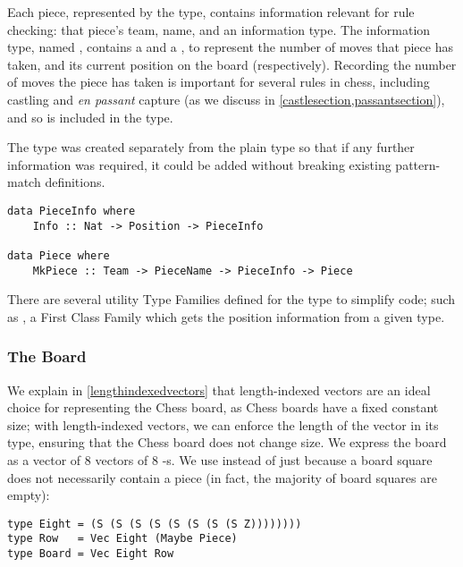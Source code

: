 Each piece, represented by the  type, contains information relevant for rule checking: that piece's team, name, and an information type. The information type, named , contains a  and a , to represent the number of moves that piece has taken, and its current position on the board (respectively). Recording the number of moves the piece has taken is important for several rules in chess, including castling and \textit{en passant} capture (as we discuss in \cref{castlesection,passantsection}), and so is included in the  type.

The  type was created separately from the plain  type so that if any further information was required, it could be added without breaking existing  pattern-match definitions.

\begin{lstlisting}
data PieceInfo where
    Info :: Nat -> Position -> PieceInfo

data Piece where
    MkPiece :: Team -> PieceName -> PieceInfo -> Piece
\end{lstlisting}

There are several utility Type Families defined for the  type to simplify code; such as , a First Class Family which gets the position information from a given  type.

\subsubsection{The Board} \label{boardtypesection}

We explain in \cref{lengthindexedvectors} that length-indexed vectors are an ideal choice for representing the Chess board, as Chess boards have a fixed constant size; with length-indexed vectors, we can enforce the length of the vector in its type, ensuring that the Chess board does not change size. We express the board as a vector of 8 vectors of 8 -s. We use  instead of just  because a board square does not necessarily contain a piece (in fact, the majority of board squares are empty):

\begin{lstlisting}
type Eight = (S (S (S (S (S (S (S (S Z))))))))
type Row   = Vec Eight (Maybe Piece)
type Board = Vec Eight Row
\end{lstlisting}

